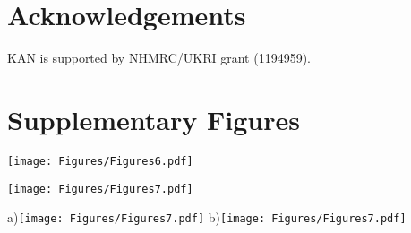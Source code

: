 \documentclass[final,3p,times,authoryear]{elsarticle}
\newcommand{\beginsupplement}{%
        \setcounter{table}{0}
        \renewcommand{\thetable}{S\arabic{table}}%
        \setcounter{figure}{0}
        \renewcommand{\thefigure}{S\arabic{figure}}%
     }
\begin{document}
\clearpage

\section{Acknowledgements}\label{sec:ack}
KAN is supported by NHMRC/UKRI grant (1194959).

%




\section{Supplementary Figures}\label{sec:suppfig}
\beginsupplement


\begin{figure*}
\centering
\texttt{[image: Figures/Figures6.pdf]}
\caption{\bf Surface fractions (in percentages) of a) grass, b) trees, c) buildings, and d) streets across Melbourne.}
 \label{fig:melfracs}
\end{figure*}

\begin{figure*}
\centering
\texttt{[image: Figures/Figures7.pdf]}
\caption{\bf Surface fractions (in percentages) of a) grass, b) trees, c) buildings, and d) streets across Sydney.}
 \label{fig:sydfracs}
\end{figure*}

\begin{figure*}
\centering
a)\texttt{[image: Figures/Figures7.pdf]}
b)\texttt{[image: Figures/Figures7.pdf]}
\caption{\bf a) \gls{tcan} and b) \gls{utci} heatmaps on February 12, 2004 at 2pm generated by matching the closest matching parameters of surface fractions and average heights for each 100$\times$100m location in Sydney from 9814 modelled scenario results (in \SI{}{\degreeCelsius}).  }
 \label{fig:TaSyd} \label{fig:utciSyd}
\end{figure*}
\end{document}
